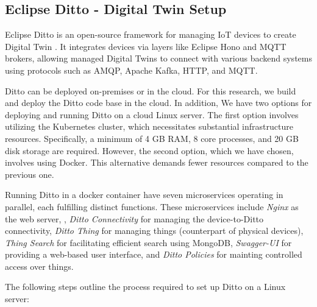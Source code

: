 

\subsection{Eclipse Ditto - Digital Twin Setup}
Eclipse Ditto is an open-source framework for managing IoT devices to create Digital Twin \cite{noauthor_eclipse_nodate}.
It integrates devices via layers like Eclipse Hono and MQTT brokers, allowing managed Digital Twins to connect with various backend systems using protocols such as AMQP, Apache Kafka, HTTP, and MQTT. 

Ditto can be deployed on-premises or in the cloud. For this research, we build and deploy the Ditto code base in the cloud.
In addition, We have two options for deploying and running Ditto on a cloud Linux server. The first option involves utilizing the Kubernetes cluster, which necessitates substantial infrastructure resources. Specifically, a minimum of 4 GB RAM, 8 core processes, and 20 GB disk storage are required. However, the second option, which we have chosen, involves using Docker. This alternative demands fewer resources compared to the previous one. 

Running Ditto in a docker container have seven microservices operating in parallel, each fulfilling distinct functions. These microservices include \textit{Nginx} as the web server, \textit{}, \textit{Ditto Connectivity} for managing the device-to-Ditto connectivity, \textit{Ditto Thing} for managing things (counterpart of physical devices), \textit{Thing Search} for facilitating efficient search using MongoDB, \textit{Swagger-UI} for providing a web-based user interface, and \textit{Ditto Policies} for mainting controlled access over things.

The following steps outline the process required to set up Ditto on a Linux server:

